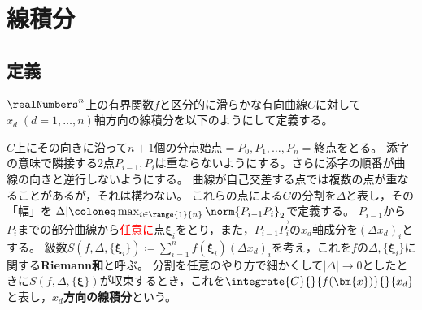 \chapter{線積分}
    \section{定義}
        $\realNumbers^n$上の有界関数$f$と区分的に滑らかな有向曲線$C$に対して$x_d\;(d=1,\dotsc,n)$軸方向の線積分を以下のようにして定義する。
        \par
        $C$上にその向きに沿って$n+1$個の分点\quad$\text{始点} = P_0, P_1, \dotsc, P_n = \text{終点}$\quad をとる。
        添字の意味で隣接する2点$P_{i-1},P_i$は重ならないようにする。さらに添字の順番が曲線の向きと逆行しないようにする。
        曲線が自己交差する点では複数の点が重なることがあるが，それは構わない。
        これらの点による$C$の分割を$\Delta$と表し，その「幅」を$|\Delta| \coloneq \max_{i\in\range{1}{n}}\norm{P_{i-1}P_i}_2$で定義する。
        $P_{i-1}$から$P_i$までの部分曲線から\textcolor{red}{任意に}点$\bm{\xi}_i$をとり，また，$\overrightarrow{P_{i-1}P_i}$の$x_d$軸成分を$(\Delta x_d)_i$とする。
        級数$S(f,\Delta,\{\bm{\xi}_i\}) \coloneq \sum_{i=1}^n f(\bm{\xi}_i)(\Delta x_d)_i$を考え，これを$f$の$\Delta, \{\bm{\xi}_i\}$に関する\textbf{Riemann和}と呼ぶ。
        分割を任意のやり方で細かくして$|\Delta|\to 0$としたときに$S(f,\Delta,\{\bm{\xi}\})$が収束するとき，これを$\integrate{C}{}{f(\bm{x})}{}{x_d}$と表し，\textbf{$x_d$方向の線積分}という。
